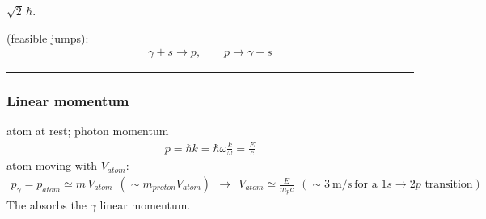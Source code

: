 \documentclass[letterpaper,10pt,english]{jupyterBook}
\begin{document}
\sphinxAtStartPar
{} \(\sqrt2\,\hbar\).

\sphinxAtStartPar
{} (feasible jumps):
\begin{equation*}
\begin{split}
\gamma+s\to p,\qquad p\to\gamma+s
\end{split}
\end{equation*}

\bigskip\hrule\bigskip

\subsubsection*{Linear momentum}

\sphinxAtStartPar
{}

\sphinxAtStartPar
{} atom at rest; photon momentum
\begin{equation*}
\begin{split}
p=\hbar k=\hbar\omega\frac k\omega=\frac Ec
\end{split}
\end{equation*}
\sphinxAtStartPar
{} atom moving with \(V_{atom}\):
\begin{equation*}
\begin{split}
p_\gamma=p_{atom}\simeq m\,V_{atom}\ \ (\sim m_{proton}V_{atom})
\ \ \to\ \ V_{atom}\simeq\frac{E}{m_pc}\ \ \left(\sim3\ \mathrm{m/s}\ \text{for a }1s\to2p\text{ transition}\right)
\end{split}
\end{equation*}
\sphinxAtStartPar
The  absorbs the \(\gamma\) linear momentum.
\end{document}
